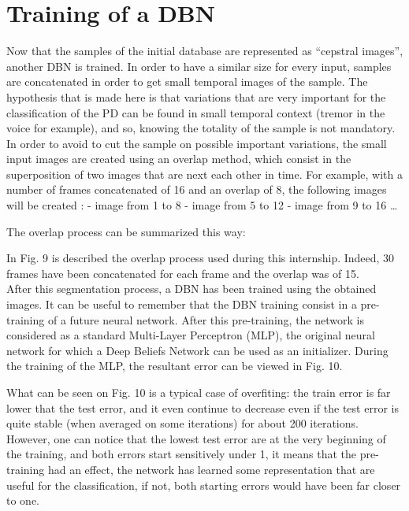 \documentclass{report}
\begin{document}
		\section{Training of a DBN}
		
		 Now that the samples of the initial database are represented as “cepstral images”, another DBN is trained. In order to have a similar size for every input, samples are concatenated in order to get small temporal images of the sample. The hypothesis that is made here is that variations that are very important for the classification of the PD can be found in small temporal context (tremor in the voice for example), and so, knowing the totality of the sample is not mandatory. In order to avoid to cut the sample on possible important variations, the small input images are created using an overlap method, which consist in the superposition of two images that are next each other in time. For example, with a number of frames concatenated of 16 and an overlap of 8, the following images will be created :
		 - image from 1 to 8
		 - image from 5 to 12
		 - image from 9 to 16
		 …
		 
		 The overlap process can be summarized this way:
		 
		 
		 In Fig. 9 is described the overlap process used during this internship. Indeed, 30 frames have been concatenated for each frame and the overlap was of 15.\\
		 
		 After this segmentation process, a DBN has been trained using the obtained images. It can be useful to remember that the DBN training consist in a pre-training of a future neural network. After this pre-training, the network is considered as a standard Multi-Layer Perceptron (MLP), the original neural network for which a Deep Beliefs Network can be used as an initializer. During the training of the MLP, the resultant error can be viewed in Fig. 10.
		 
		 
		 What can be seen on Fig. 10 is a typical case of overfiting: the train error is far lower that the test error, and it even continue to decrease even if the test error is quite stable (when averaged on some iterations) for about 200 iterations. However, one can notice that the lowest test error are at the very beginning of the training, and both errors start sensitively under 1, it means that the pre-training had an effect, the network has learned some representation that are useful for the classification, if not, both starting errors would have been far closer to one.\\
		 
\end{document}
